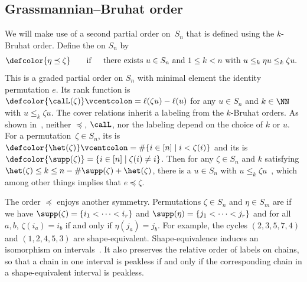 \subsection{Grassmannian--Bruhat order}\label{SS:GBO}

We will make use of a second partial order on~$S_n$ that is defined using the
$k$-Bruhat order. Define the  on $S_n$ by
\begin{equation*}
    \defcolor{\eta\preceq\zeta}
    \qquad\text{if}\quad
    \begin{array}{c}
        \text{there exists $u \in S_n$ and $1\leq k < n$ with $u\leq_k \eta u\leq_k\zeta u$.}
    \end{array}
\end{equation*}
This is a graded partial order on $S_n$ with minimal element the identity permutation $e$.
Its rank function is $\defcolor{\calL(\zeta)}\vcentcolon=\ell(\zeta u)-\ell(u)$ for any $u \in S_n$ and $k \in \NN$ with
$u\leq_k\zeta u$. 
The cover relations inherit a labeling from the $k$-Bruhat orders.
As shown in~\cite[Sect.~3.2]{BS-Bruhat}, neither $\preceq$, $\calL$, nor the labeling depend on the choice of $k$ or $u$.
For a permutation~$\zeta\in S_n$, its  is 
$\defcolor{\het(\zeta)} \vcentcolon= \#\{i\in[n]\mid i<\zeta(i)\}$ and its  
 is $\defcolor{\supp(\zeta)} = \{i\in[n]\mid\zeta(i)\neq i\}$.
Then for any $\zeta \in S_n$ and $k$ satisfying $\het(\zeta)\leq k\leq n-\#\supp(\zeta)+\het(\zeta)$,
there is a $u\in S_n$ with $u\leq_k \zeta u$~\cite[Thm.~3.1.5]{BS-Bruhat},
which among other things implies that $e \preceq \zeta$.

The order $\preceq$ enjoys another symmetry.
Permutations $\zeta\in S_n$ and $\eta\in S_m$ are  if we have 
$\supp(\zeta)=\{i_1<\dotsb<i_r\}$ and $\supp(\eta)=\{j_1<\dotsb<j_r\}$ and for all $a,b$, $\zeta(i_a)=i_b$
if and only if $\eta(j_a)=j_b$.
For example, the cycles  $(2,3,5,7,4)$ and $(1,2,4,5,3)$ are shape-equivalent.
Shape-equivalence 
induces an isomorphism on intervals~\cite[Thm.~3.2.3({\it v})]{BS-Bruhat}.
It also preserves the relative order of labels on chains,
so that a chain in one interval is peakless if and only if the corresponding chain in a shape-equivalent interval is peakless.

